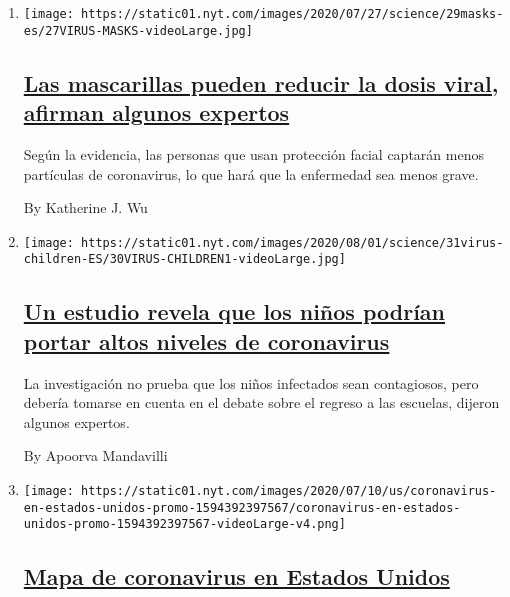 \begin{enumerate}
\def\labelenumi{\arabic{enumi}.}
\item
  \texttt{[image: https://static01.nyt.com/images/2020/07/27/science/29masks-es/27VIRUS-MASKS-videoLarge.jpg]}

  \hypertarget{las-mascarillas-pueden-reducir-la-dosis-viral-afirman-algunos-expertos}{%
  \subsection{\texorpdfstring{\href{/es/2020/07/29/espanol/ciencia-y-tecnologia/proteccion-cubrebocas-coronavirus.html}{Las
  mascarillas pueden reducir la dosis viral, afirman algunos
  expertos}}{Las mascarillas pueden reducir la dosis viral, afirman algunos expertos}}\label{las-mascarillas-pueden-reducir-la-dosis-viral-afirman-algunos-expertos}}

  Según la evidencia, las personas que usan protección facial captarán
  menos partículas de coronavirus, lo que hará que la enfermedad sea
  menos grave.

  By Katherine J. Wu
\item
  \texttt{[image: https://static01.nyt.com/images/2020/08/01/science/31virus-children-ES/30VIRUS-CHILDREN1-videoLarge.jpg]}

  \hypertarget{un-estudio-revela-que-los-niuxf1os-podruxedan-portar-altos-niveles-de-coronavirus}{%
  \subsection{\texorpdfstring{\href{/es/2020/07/31/espanol/ciencia-y-tecnologia/ninos-contagio-coronavirus.html}{Un
  estudio revela que los niños podrían portar altos niveles de
  coronavirus}}{Un estudio revela que los niños podrían portar altos niveles de coronavirus}}\label{un-estudio-revela-que-los-niuxf1os-podruxedan-portar-altos-niveles-de-coronavirus}}

  La investigación no prueba que los niños infectados sean contagiosos,
  pero debería tomarse en cuenta en el debate sobre el regreso a las
  escuelas, dijeron algunos expertos.

  By Apoorva Mandavilli
\item
  \texttt{[image: https://static01.nyt.com/images/2020/07/10/us/coronavirus-en-estados-unidos-promo-1594392397567/coronavirus-en-estados-unidos-promo-1594392397567-videoLarge-v4.png]}

  \hypertarget{mapa-de-coronavirus-en-estados-unidos}{%
  \subsection{\texorpdfstring{\href{/es/interactive/2020/espanol/mundo/coronavirus-en-estados-unidos.html}{Mapa
  de coronavirus en Estados
  Unidos}}{Mapa de coronavirus en Estados Unidos}}\label{mapa-de-coronavirus-en-estados-unidos}}


\end{enumerate}
